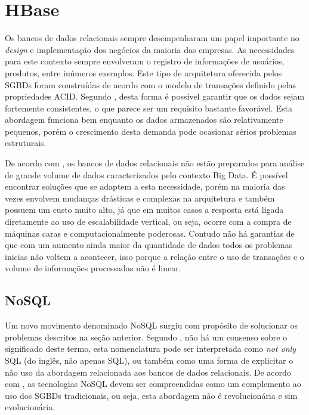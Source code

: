 \section{HBase}

Os bancos de dados relacionais sempre desempenharam um papel importante no \textit{design} e implementação dos negócios da maioria das empresas. As necessidades para este contexto sempre envolveram o registro de informações de usuários, produtos, entre inúmeros exemplos. Este tipo de arquitetura oferecida pelos SGBDs foram construídas de acordo com o modelo de transações definido pelas propriedades ACID. Segundo , desta forma é possível garantir que os dados sejam fortemente consistentes, o que parece ser um requisito bastante favorável. Esta abordagem funciona bem enquanto os dados armazenados são relativamente pequenos, porém o crescimento desta demanda pode ocasionar sérios problemas estruturais.

De acordo com , os bancos de dados relacionais não estão preparados para análise de grande volume de dados caracterizados pelo contexto Big Data. É possível encontrar soluções que se adaptem a esta necessidade, porém na maioria das vezes envolvem mudanças drásticas e complexas na arquitetura e também possuem um custo muito alto, já que em muitos casos a resposta está ligada diretamente ao uso de escalabilidade vertical, ou seja, ocorre com a compra de máquinas caras e computacionalmente poderosas. Contudo não há garantias de que com um aumento ainda maior da quantidade de dados todos os problemas inicias não voltem a acontecer, isso porque a relação entre o uso de transações e o volume de informações processadas não é linear.

\subsection{NoSQL}

Um novo movimento denominado NoSQL surgiu com propósito de solucionar os problemas  descritos na seção anterior. Segundo , não há um consenso sobre o significado deste termo, esta nomenclatura pode ser interpretada como \textit{not only} SQL (do inglês, não apenas SQL), ou também como uma forma de explicitar o não uso da abordagem relacionada aos bancos de dados relacionais. De acordo com , as tecnologias NoSQL devem ser compreendidas como um complemento ao uso dos SGBDs tradicionais, ou seja, esta abordagem não é revolucionária e sim evolucionária. 

